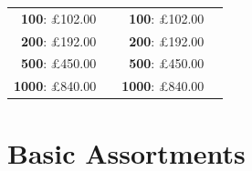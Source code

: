 \documentclass[11pt, english]{article}
\begin{document}
\begin{table}[h]
\begin{center}
\begin{tabular}{r|p{4cm}r|p{4cm}}
		\textbf{100}: \pounds102.00 & & \textbf{100}: \pounds102.00 & \\
		\textbf{200}: \pounds192.00 & & \textbf{200}: \pounds192.00 & \\
		\textbf{500}: \pounds450.00 & & \textbf{500}: \pounds450.00 & \\
		\textbf{1000}: \pounds840.00 & & \textbf{1000}: \pounds840.00 & \\
	\end{tabular}
	\end{center}
	\end{table}

\newpage

\section{Basic Assortments}
\end{document}
